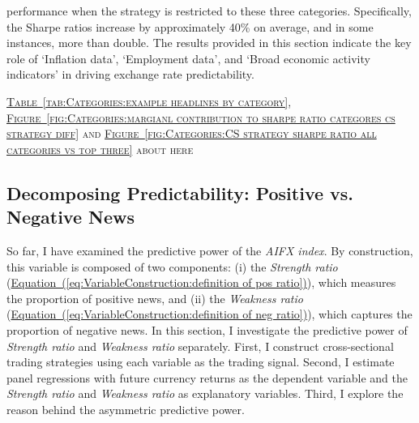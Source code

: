 \documentclass[12pt,oneside,letter]{article}
\newcommand*{\mytab}[1]{\hyperref[{#1}]{Table~\ref*{#1}}}
\newcommand*{\myfig}[1]{\hyperref[{#1}]{Figure~\ref*{#1}}}
\newcommand*{\myeq}[1]{\hyperref[{#1}]{Equation~(\ref*{#1})}}
\begin{document}
performance when the strategy is restricted to these three categories. Specifically, the Sharpe ratios increase by approximately 40\% on average, and in some instances, more than double. The results provided in this section indicate the key role of ‘Inflation data’, ‘Employment data’, and ‘Broad economic activity indicators’ in driving exchange rate predictability.
		\begin{center}
			\textsc{\mytab{tab:Categories:example headlines by category}, \myfig{fig:Categories:margianl contribution to sharpe ratio categores cs strategy diff} and \myfig{fig:Categories:CS strategy sharpe ratio all categories vs top three} about here}  
		\end{center}
		\subsection{Decomposing Predictability: Positive vs. Negative News} \label{sec:Mechanism:StrengthVsWeakness}
		So far, I have examined the predictive power of the \textit{AIFX index}. By construction, this variable is composed of two components: (i) the \textit{Strength ratio} (\myeq{eq:VariableConstruction:definition of pos ratio}), which measures the proportion of positive news, and (ii) the \textit{Weakness ratio} (\myeq{eq:VariableConstruction:definition of neg ratio}), which captures the proportion of negative news. In this section, I investigate the predictive power of \textit{Strength ratio} and \textit{Weakness ratio} separately. First, I construct cross-sectional trading strategies using each variable as the trading signal. Second, I estimate panel regressions with future currency returns as the dependent variable and the \textit{Strength ratio} and \textit{Weakness ratio} as explanatory variables. Third, I explore the reason behind the asymmetric predictive power.
		
\end{document}
